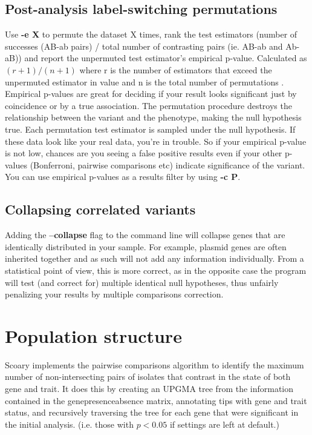 \documentclass{article}
\begin{document}
    \subsection{Post-analysis label-switching permutations}
      Use \textbf{-e X} to permute the dataset X times, rank the test estimators (number of successes (AB-ab pairs) / total number of contrasting pairs (ie. AB-ab and Ab-aB)) and report the unpermuted test estimator's empirical p-value. Calculated as $(r+1)/(n+1)$ where r is the number of estimators that exceed the unpermuted estimator in value and n is the total number of permutations \cite{north2002note}. Empirical p-values are great for deciding if your result looks significant just by coincidence or by a true association. The permutation procedure destroys the relationship between the variant and the phenotype, making the null hypothesis true. Each permutation test estimator is sampled under the null hypothesis. If these data look like your real data, you're in trouble. So if your empirical p-value is not low, chances are you seeing a false positive results even if your other p-values (Bonferroni, pairwise comparisons etc) indicate significance of the variant. You can use empirical p-values as a results filter by using \textbf{-c P}.\\

    \subsection{Collapsing correlated variants}
      Adding the \textbf{--collapse} flag to the command line will collapse genes that are identically distributed in your sample. For example, plasmid genes are often inherited together and as such will not add any information individually. From a statistical point of view, this is more correct, as in the opposite case the program will test (and correct for) multiple identical null hypotheses, thus unfairly penalizing your results by multiple comparisons correction. \\

  \section{Population structure}
    Scoary implements the pairwise comparisons algorithm \cite{read1995inference,maddison2000testing} to identify the maximum number of non-intersecting pairs of isolates that contrast in the state of both gene and trait. It does this by creating an UPGMA tree from the information contained in the gene\textunderscore presence\textunderscore absence matrix, annotating tips with gene and trait status, and recursively traversing the tree for each gene that were significant in the initial analysis. (i.e. those with $p<0.05$ if settings are left at default.) \\
\end{document}
